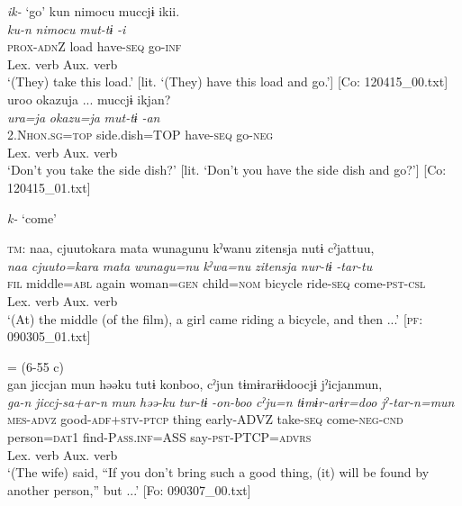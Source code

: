 \ea  
\exi{}\textit{ik-} ‘go’ \label{ex:9.20}
\ea %
   \gllll   kun  {\textbar}nimocu{\textbar}  muccjɨ  ikii.\\
      \textit{ku-n}  \textit{nimocu}  \textit{mut-tɨ}  \textit{-i}\\
      \textsc{prox}-\textsc{adn}Z  load  have-\textsc{seq}  go-\textsc{inf}\\
        {} {} {Lex. verb}  {Aux. verb}\\
      \glt       ‘(They) take this load.’ [lit. ‘(They) have this load and go.’] [Co: 120415\_00.txt]
\ex 
\gllll   uroo  {\textbar}okazu{\textbar}ja  ...  muccjɨ  ikjan?\\
      \textit{ura=ja}  \textit{okazu=ja}    \textit{mut-tɨ}  \textit{-an}\\
      2.N\textsc{hon}.\textsc{sg}=\textsc{top}  side.dish=TOP    have-\textsc{seq}  go-\textsc{neg}\\
       {}  {}   {Lex. verb}  {Aux. verb}\\
      \glt       ‘Don’t you take the side dish?’ [lit. ‘Don’t you have the side dish and go?’] [Co: 120415\_01.txt]

\exi{} \textit{k-} ‘come’

\ex %
\gllll  \textsc{tm}:  naa,  cjuutokara  mata  wunagunu  kˀwanu  {\textbar}zitensja{\textbar} nutɨ  cˀjattuu,\\
      \textit{naa}  \textit{cjuuto=kara}  \textit{mata}  \textit{wunagu=nu}  \textit{kˀwa=nu}  \textit{zitensja}  \textit{nur-tɨ}  \textit{-tar-tu}\\
      \textsc{fil}  middle=\textsc{abl}  again  woman=\textsc{gen}  child=\textsc{nom}  bicycle    ride-\textsc{seq}  come-\textsc{pst}-\textsc{csl}\\
             {}          {}                {}         {}      {}    {}   {Lex. verb}  {Aux. verb}\\
      \glt       ‘(At) the middle (of the film), a girl came riding a bicycle, and then ...’ [\textsc{pf}: 090305\_01.txt]

\ex{} = (6-55 c)\\
    \gllll gan  jiccjan  mun  həəku  tutɨ  konboo,  cˀjun  tɨmɨrarɨɨdoocjɨ  jˀicjanmun,\\
      \textit{ga-n}  \textit{jiccj-sa+ar-n}  \textit{mun}  \textit{həə-ku}  \textit{tur-tɨ} \textit{-on-boo}  \textit{cˀju=n}  \textit{tɨmɨr-arɨr=doo}  \textit{jˀ-tar-n=mun}\\
      \textsc{mes}-\textsc{advz}  good-\textsc{adf}+\textsc{stv}-\textsc{ptcp}  thing  early-ADVZ  take-\textsc{seq}  come-\textsc{neg}-\textsc{cnd}  person=\textsc{dat}1  find-P\textsc{ass}.\textsc{inf}=ASS  say-\textsc{pst}-PTCP=\textsc{advrs}\\
         {} {} {} {}     {Lex. verb}  {Aux. verb}\\              
      \glt ‘(The wife) said, “If you don’t bring such a good thing, (it) will be found by another person,” but ...’   [Fo: 090307\_00.txt]
    \z
\z

